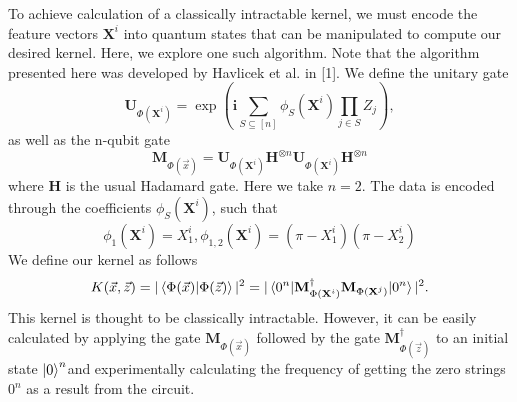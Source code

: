 \documentclass[twocolumn, english]{revtex4-2}
\begin{document}
To achieve calculation of a classically intractable kernel, we must encode the feature vectors $\textbf{X}^{i}$ into quantum states that can be manipulated to compute our desired kernel. Here, we explore one such algorithm. Note that the algorithm presented here was developed by Havlicek et al. in [1]. We define the unitary gate \begin{equation}\textbf{U}_{\Phi(\textbf{X}^{i})}=\exp(\textbf{i}\sum_{S\subseteq[n]}\phi_{S}(\textbf{X}^{i})\prod_{j\in S}Z_{j}),\end{equation} as well as the n-qubit gate \begin{equation}\textbf{M}_{\Phi(\vec{x})}=\textbf{U}_{\Phi(\textbf{X}^{i})}\textbf{H}^{\otimes n}\textbf{U}_{\Phi(\textbf{X}^{i})}\textbf{H}^{\otimes n}\end{equation} where \textbf{H} is the usual Hadamard gate. Here we take $n=2$. The data is encoded through the coefficients $\phi_{S}(\textbf{X}^{i})$, such that \begin{equation}\phi_{1}(\textbf{X}^{i})=X_{1}^{i}, \phi_{1, 2}(\textbf{X}^{i})=(\pi-X_{1}^{i})(\pi-X_{2}^{i})\end{equation} We define our kernel as follows \begin{equation}K(\vec{x}, \vec{z})=|\braket{\Phi(\vec{x})|\Phi(\vec{z})}|^2 = |\braket{0^n|\textbf{M}^{\dag}_{\Phi(\textbf{X}^{i})}\textbf{M}_{\Phi(\textbf{X}^{j})}|0^n}|^2. \end{equation} This kernel is thought to be classically intractable. However, it can be easily calculated by applying the gate $\textbf{M}_{\Phi(\vec{x})}$ followed by the gate $\textbf{M}^{\dag}_{\Phi(\vec{z})}$ to an initial state $\ket{0}^{n}$and experimentally calculating the frequency of getting the zero strings $0^n$ as a result from the circuit. 
\end{document}
